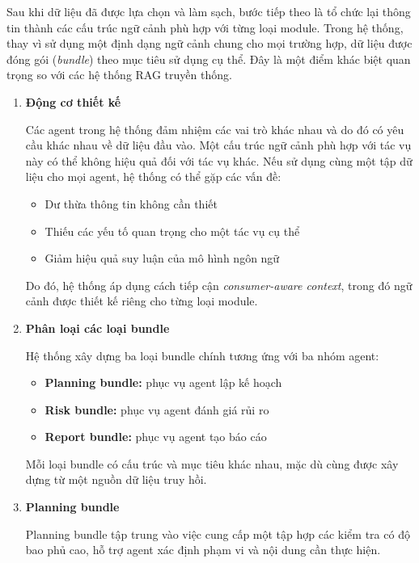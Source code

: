 Sau khi dữ liệu đã được lựa chọn và làm sạch, bước tiếp theo là tổ chức lại thông tin thành các cấu trúc ngữ cảnh phù hợp với từng loại module. Trong hệ thống, thay vì sử dụng một định dạng ngữ cảnh chung cho mọi trường hợp, dữ liệu được đóng gói (\textit{bundle}) theo mục tiêu sử dụng cụ thể. Đây là một điểm khác biệt quan trọng so với các hệ thống RAG truyền thống.

\begin{enumerate}
    \item \textbf{Động cơ thiết kế}

    Các agent trong hệ thống đảm nhiệm các vai trò khác nhau và do đó có yêu cầu khác nhau về dữ liệu đầu vào. Một cấu trúc ngữ cảnh phù hợp với tác vụ này có thể không hiệu quả đối với tác vụ khác. Nếu sử dụng cùng một tập dữ liệu cho mọi agent, hệ thống có thể gặp các vấn đề:
    \begin{itemize}
        \item Dư thừa thông tin không cần thiết
        \item Thiếu các yếu tố quan trọng cho một tác vụ cụ thể
        \item Giảm hiệu quả suy luận của mô hình ngôn ngữ
    \end{itemize}

    Do đó, hệ thống áp dụng cách tiếp cận \textit{consumer-aware context}, trong đó ngữ cảnh được thiết kế riêng cho từng loại module.

    \item \textbf{Phân loại các loại bundle}

    Hệ thống xây dựng ba loại bundle chính tương ứng với ba nhóm agent:
    \begin{itemize}
        \item \textbf{Planning bundle:} phục vụ agent lập kế hoạch
        \item \textbf{Risk bundle:} phục vụ agent đánh giá rủi ro
        \item \textbf{Report bundle:} phục vụ agent tạo báo cáo
    \end{itemize}

    Mỗi loại bundle có cấu trúc và mục tiêu khác nhau, mặc dù cùng được xây dựng từ một nguồn dữ liệu truy hồi.

    \item \textbf{Planning bundle}

    Planning bundle tập trung vào việc cung cấp một tập hợp các kiểm tra có độ bao phủ cao, hỗ trợ agent xác định phạm vi và nội dung cần thực hiện.


\end{enumerate}
